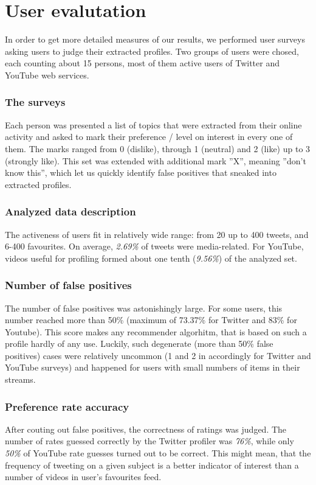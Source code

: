 \section{User evalutation}
In order to get more detailed measures of our results, we performed user surveys
asking users to judge their extracted profiles. Two groups of users were chosed,
each counting about 15 persons, most of them active users of Twitter and YouTube
web services.

\subsubsection{The surveys}

Each person was presented a list of topics that were extracted from their online
activity and asked to mark their preference / level on interest in every one of
them. The marks ranged from 0 (dislike), through 1 (neutral) and 2 (like) up to
3 (strongly like). This set was extended with additional mark ''X'', meaning
''don't know this'', which let us quickly identify false positives that sneaked
into extracted profiles.

\subsubsection{Analyzed data description}
The activeness of users fit in relatively wide range: from 20 up to 400 tweets,
and 6-400 favourites. On average, \textit{2.69\%} of tweets were media-related.
For YouTube, videos useful for profiling formed about one tenth (\textit{9.56\%})
of the analyzed set.

\subsubsection{Number of false positives}
The number of false positives was astonishingly large. For some users, this
number reached more than 50\% (maximum of 73.37\% for Twitter and 83\% for
Youtube). This score makes any
recommender algorhitm, that is based on such a profile hardly of any use.
Luckily, such degenerate (more than 50\% false positives) cases were relatively
uncommon (1 and 2 in accordingly for Twitter and YouTube surveys) and happened
for users with small numbers of items in their streams.

\subsubsection{Preference rate accuracy}
After couting out false positives, the correctness of ratings was judged. The
number of rates guessed correctly by the Twitter profiler was \textit{76\%},
while only \textit{50\%} of YouTube rate guesses turned out to be correct. This
might mean, that the frequency of tweeting on a given subject is a better
indicator of interest than a number of videos in user's favourites feed.
